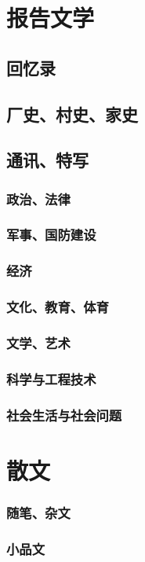 \documentclass[UTF8]{../../RepresentationUniverse}
\begin{document}
\section{报告文学}
    \subsection{回忆录}
    \subsection{厂史、村史、家史}
    \subsection{通讯、特写}
        \subsubsection{政治、法律}
        \subsubsection{军事、国防建设}
        \subsubsection{经济}
        \subsubsection{文化、教育、体育}
        \subsubsection{文学、艺术}
        \subsubsection{科学与工程技术}
        \subsubsection{社会生活与社会问题}



\section{散文}
\subsubsection{随笔、杂文}
\subsubsection{小品文}
\end{document}
